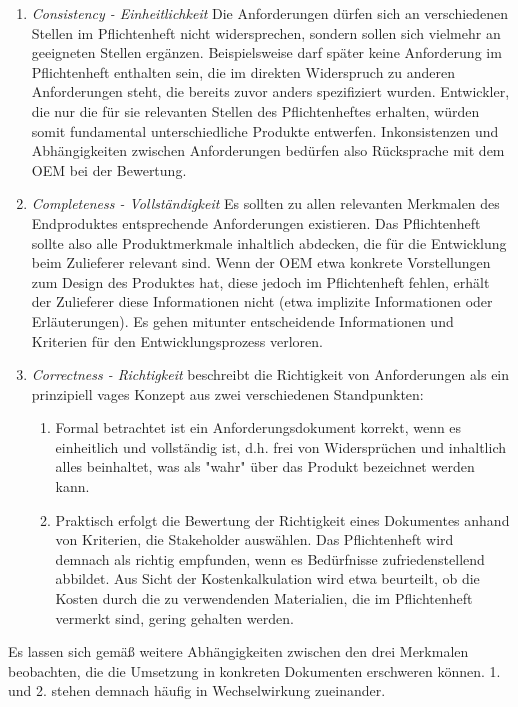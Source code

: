 \documentclass[12pt]{report}
\begin{document}
\begin{enumerate}
\item \textit{Consistency - Einheitlichkeit} Die Anforderungen dürfen sich an verschiedenen Stellen im Pflichtenheft nicht widersprechen, sondern sollen sich vielmehr an geeigneten Stellen ergänzen. Beispielsweise darf später keine Anforderung im Pflichtenheft enthalten sein, die im direkten Widerspruch zu anderen Anforderungen steht, die bereits zuvor anders spezifiziert wurden. Entwickler, die nur die für sie relevanten Stellen des Pflichtenheftes erhalten, würden somit fundamental unterschiedliche Produkte entwerfen. Inkonsistenzen und Abhängigkeiten zwischen Anforderungen bedürfen also Rücksprache mit dem OEM bei der Bewertung.
\item \textit{Completeness - Vollständigkeit} Es sollten zu allen relevanten Merkmalen des Endproduktes entsprechende Anforderungen existieren. Das Pflichtenheft sollte also alle Produktmerkmale inhaltlich abdecken, die für die Entwicklung beim Zulieferer relevant sind. Wenn der OEM etwa konkrete Vorstellungen zum Design des Produktes hat, diese jedoch im Pflichtenheft fehlen, erhält der Zulieferer diese Informationen nicht (etwa implizite Informationen oder Erläuterungen). Es gehen mitunter entscheidende Informationen und Kriterien für den Entwicklungsprozess verloren.
\item \textit{Correctness - Richtigkeit} \cite{zg02} beschreibt die Richtigkeit von Anforderungen als ein prinzipiell vages Konzept aus zwei verschiedenen Standpunkten:
\begin{enumerate}
\item Formal betrachtet ist ein Anforderungsdokument korrekt, wenn es einheitlich und vollständig ist, d.h. frei von Widersprüchen und inhaltlich alles beinhaltet, was als "wahr" über das Produkt bezeichnet werden kann.
\item Praktisch erfolgt die Bewertung der Richtigkeit eines Dokumentes anhand von Kriterien, die Stakeholder auswählen. Das Pflichtenheft wird demnach als richtig empfunden, wenn es Bedürfnisse zufriedenstellend abbildet. Aus Sicht der Kostenkalkulation wird etwa beurteilt, ob die Kosten durch die zu verwendenden Materialien, die im Pflichtenheft vermerkt sind, gering gehalten werden.
\end{enumerate}
\end{enumerate}

Es lassen sich gemäß \cite{zg02} weitere Abhängigkeiten zwischen den drei Merkmalen beobachten, die die Umsetzung in konkreten Dokumenten erschweren können. 1. und 2. stehen demnach häufig in Wechselwirkung zueinander. 
\end{document}
